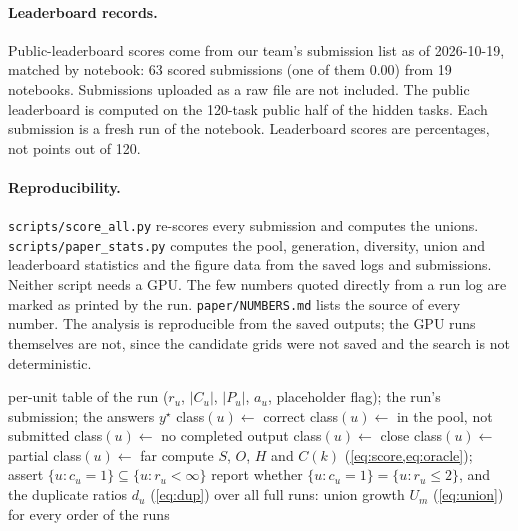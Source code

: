 \documentclass[11pt]{article}
\newcommand{\code}[1]{\texttt{#1}}
\begin{document}
\paragraph{Leaderboard records.}
Public-leaderboard scores come from our team's submission list as of 2026-10-19, matched by notebook: 63 scored submissions (one of them 0.00) from 19 notebooks. Submissions uploaded as a raw file are not included. The public leaderboard is computed on the 120-task public half of the hidden tasks. Each submission is a fresh run of the notebook. Leaderboard scores are percentages, not points out of 120.

\paragraph{Reproducibility.}
\code{scripts/score\_all.py} re-scores every submission and computes the unions. \code{scripts/paper\_stats.py} computes the pool, generation, diversity, union and leaderboard statistics and the figure data from the saved logs and submissions. Neither script needs a GPU.
The few numbers quoted directly from a run log are marked as printed by the run. \code{paper/NUMBERS.md} lists the source of every number. The analysis is reproducible from the saved outputs; the GPU runs themselves are not, since the candidate grids were not saved and the search is not deterministic.

\begin{algorithm}[t]
\caption{Pool decomposition of one logged run (\code{scripts/paper\_stats.py}).}
\label{alg:measure}
\begin{algorithmic}[1]
\Require per-unit table of the run ($r_u$, $|C_u|$, $|P_u|$, $a_u$, placeholder flag); the run's submission; the answers $y^\star$
   \State class$(u) \gets$ correct 
   \State class$(u) \gets$ in the pool, not submitted
   \State class$(u) \gets$ no completed output
   \State class$(u) \gets$ close 
   \State class$(u) \gets$ partial
  \Else \State class$(u) \gets$ far
  \EndIf
\EndFor
\State compute $S$, $O$, $H$ and $C(k)$ (\cref{eq:score,eq:oracle}); assert $\{u : c_u = 1\} \subseteq \{u : r_u < \infty\}$
\State report whether $\{u : c_u = 1\} = \{u : r_u \le 2\}$, and the duplicate ratios $d_u$ (\cref{eq:dup})
\State over all full runs: union growth $U_m$ (\cref{eq:union}) for every order of the runs
\end{algorithmic}
\end{algorithm}
\end{document}
